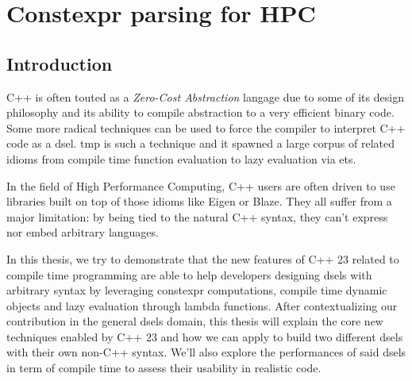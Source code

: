 \documentclass[english,12pt,a4paper]{book}
\providecommand{\cpp}{\textsc{C++}\xspace}
\begin{document}
\chapter{
  Constexpr parsing for HPC
}

\section{Introduction}


\cpp is often touted as a \textit{Zero-Cost Abstraction} langage due to some of
its design philosophy and its ability to compile abstraction to a very efficient
binary code. Some more radical techniques can be used to force the compiler to
interpret \cpp code as a \gls{dsel}. \Gls{tmp} is such a technique
and it spawned a large corpus of related idioms from compile time function
evaluation to lazy evaluation via \glspl{et}.

In the field of High Performance Computing, \cpp users are often driven to use
libraries built on top of those idioms like Eigen\cite{eigen} or
Blaze\cite{blazelib,iglberger2012_2}. They all suffer from a major limitation:
by being tied to the natural \cpp syntax, they can't express nor embed arbitrary
languages.

In this thesis, we try to demonstrate that the new features of \cpp23 related to
compile time programming are able to help developers designing \glspl{dsel} with
arbitrary syntax by leveraging \gls{constexpr} computations, compile time dynamic
objects and lazy evaluation through lambda functions. After contextualizing our
contribution in the general \glspl{dsel} domain, this thesis will explain the core
new techniques enabled by \cpp23 and how we can apply to build two different
\glspl{dsel} with their own non-\cpp syntax. We'll also explore the performances of
said \glspl{dsel} in term of compile time to assess their usability in realistic code.
\end{document}
